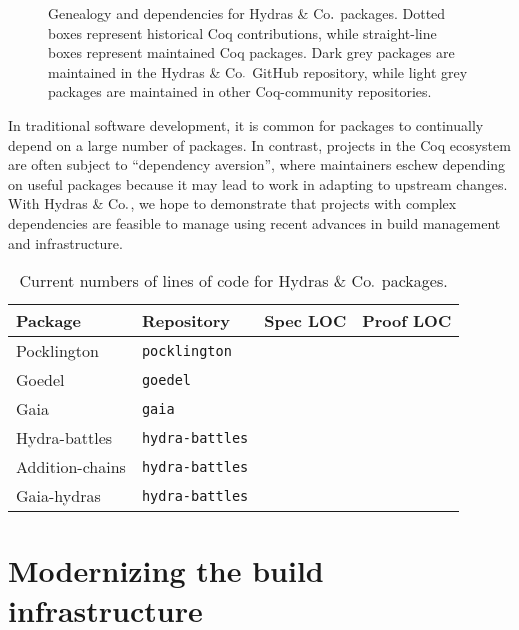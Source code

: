 \documentclass{easychair}
\newcommand{\community}{Coq-community\xspace}
\newcommand{\Hydras}{Hydras \& Co$\text.$\xspace}
\begin{document}
\begin{figure}[h]
{
}
\caption{Genealogy and dependencies for \Hydras packages. Dotted boxes represent historical Coq contributions, while straight-line boxes represent maintained Coq packages. Dark grey packages are maintained in the \Hydras GitHub repository, while light grey packages are maintained in other \community repositories.}
  \label{fig:genealogy}
\end{figure}

In traditional software development, it is common for packages to continually depend on a large number of packages. In contrast, projects in the Coq ecosystem are often subject to ``dependency aversion'', where maintainers eschew depending on useful packages because it may lead to work in adapting to upstream changes. With \Hydras, we hope to demonstrate that projects with complex dependencies are feasible to manage using recent advances in build management and infrastructure.

\begin{table}
\centering
\footnotesize
\begin{tabular}{|l|l|l|l|}
\hline
\textbf{Package} & \textbf{Repository} & \textbf{Spec LOC} & \textbf{Proof LOC}\\
\hline
Pocklington & \texttt{pocklington} & & \\
\hline
Goedel & \texttt{goedel} & & \\
\hline
Gaia & \texttt{gaia} & & \\
\hline
Hydra-battles & \texttt{hydra-battles} & & \\
\hline
Addition-chains & \texttt{hydra-battles} & & \\
\hline
Gaia-hydras & \texttt{hydra-battles} & & \\
\hline
\end{tabular}
\caption{Current numbers of lines of code for \Hydras packages.}
\label{tbl:loc}
\end{table}


\section{Modernizing the build infrastructure}
\end{document}
